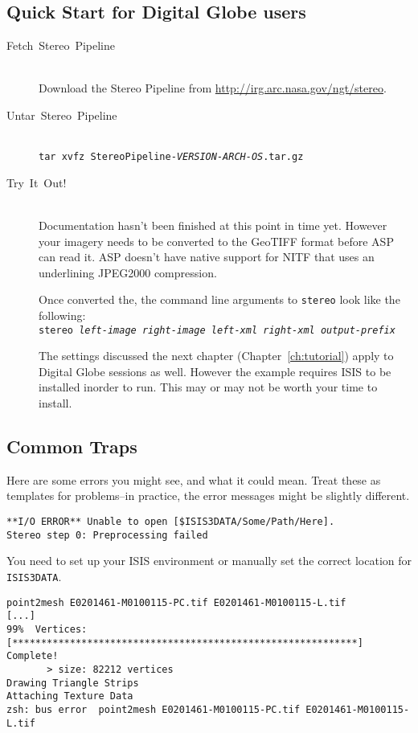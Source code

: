 \subsection{Quick Start for Digital Globe users}
\begin{description}

\item[{Fetch~Stereo~Pipeline}] ~\\
Download the Stereo Pipeline from \url{http://irg.arc.nasa.gov/ngt/stereo}.

\item[{Untar~Stereo~Pipeline}] ~\\
\texttt{tar xvfz StereoPipeline-\textit{VERSION-ARCH-OS}.tar.gz}

\item [{Try~It~Out!}] ~\\
Documentation hasn't been finished at this point in time yet. However
your imagery needs to be converted to the GeoTIFF format before ASP
can read it. ASP doesn't have native support for NITF that uses an
underlining JPEG2000 compression.

Once converted the, the command line arguments to \texttt{stereo} look
like the following: ~\\
\texttt{stereo \textit{left-image} \textit{right-image} \textit{left-xml} \textit{right-xml} \textit{output-prefix}}

The settings discussed the next chapter (Chapter~\ref{ch:tutorial})
apply to Digital Globe sessions as well. However the example requires
ISIS to be installed inorder to run. This may or may not be worth your
time to install.
\end{description}

\subsection{Common Traps}

Here are some errors you might see, and what it could mean. Treat
these as templates for problems--in practice, the error messages might
be slightly different.

\begin{verbatim}
**I/O ERROR** Unable to open [$ISIS3DATA/Some/Path/Here].
Stereo step 0: Preprocessing failed
\end{verbatim}

You need to set up your ISIS environment or manually set the correct location for \texttt{ISIS3DATA}.

\begin{verbatim}
point2mesh E0201461-M0100115-PC.tif E0201461-M0100115-L.tif
[...]
99%  Vertices:   [************************************************************] Complete!
       > size: 82212 vertices
Drawing Triangle Strips
Attaching Texture Data
zsh: bus error  point2mesh E0201461-M0100115-PC.tif E0201461-M0100115-L.tif
\end{verbatim}

